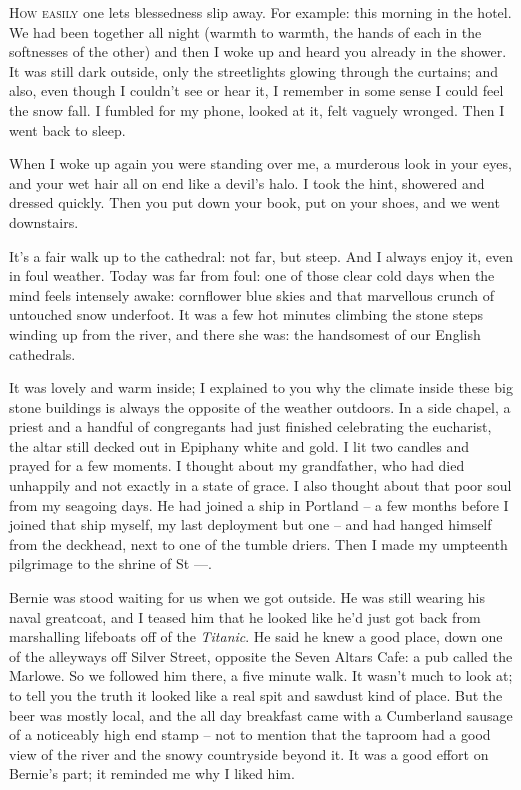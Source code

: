 \textsc{How easily} one lets blessedness slip away. For example: this morning in the hotel. We had been together all night (warmth to warmth, the hands of each in the softnesses of the other) and then I woke up and heard you already in the shower. It was still dark outside, only the streetlights glowing through the curtains; and also, even though I couldn't see or hear it, I remember in some sense I could feel the snow fall. I fumbled for my phone, looked at it, felt vaguely wronged. Then I went back to sleep.

When I woke up again you were standing over me, a murderous look in your eyes, and your wet hair all on end like a devil's halo. I took the hint, showered and dressed quickly. Then you put down your book, put on your shoes, and we went downstairs.

It's a fair walk up to the cathedral: not far, but steep. And I always enjoy it, even in foul weather. Today was far from foul: one of those clear cold days when the mind feels intensely awake: cornflower blue skies and that marvellous crunch of untouched snow underfoot. It was a few hot minutes climbing the stone steps winding up from the river, and there she was: the handsomest of our English cathedrals.

It was lovely and warm inside; I explained to you why the climate inside these big stone buildings is always the opposite of the weather outdoors. In a side chapel, a priest and a handful of congregants had just finished celebrating the eucharist, the altar still decked out in Epiphany white and gold. I lit two candles and prayed for a few moments. I thought about my grandfather, who had died unhappily and not exactly in a state of grace. I also thought about that poor soul from my seagoing days. He had joined a ship in Portland -- a few months before I joined that ship myself, my last deployment but one -- and had hanged himself from the deckhead, next to one of the tumble driers. Then I made my umpteenth pilgrimage to the shrine of St ---.

Bernie was stood waiting for us when we got outside. He was still wearing his naval greatcoat, and I teased him that he looked like he'd just got back from marshalling lifeboats off of the \textit{Titanic}. He said he knew a good place, down one of the alleyways off Silver Street, opposite the Seven Altars Cafe: a pub called the Marlowe. So we followed him there, a five minute walk. It wasn't much to look at; to tell you the truth it looked like a real spit and sawdust kind of place. But the beer was mostly local, and the all day breakfast came with a Cumberland sausage of a noticeably high end stamp -- not to mention that the taproom had a good view of the river and the snowy countryside beyond it. It was a good effort on Bernie's part; it reminded me why I liked him.

